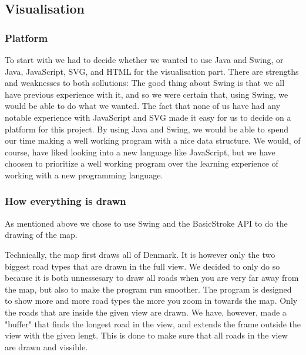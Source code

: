 \documentclass[a4paper,11pt]{article}
\begin{document}
\subsection{Visualisation} %
\label{sub:Visualisation}


\subsubsection{Platform} %
\label{subsub:Platform}
To start with we had to decide whether we wanted to use Java and Swing, or Java, JavaScript, SVG, and HTML for the visualisation part. There are strengths and weaknesses to both sollutions: The good thing about Swing is that we all have previous experience with it, and so we were certain that, using Swing, we would be able to do what we wanted. 
The fact that none of us have had any notable experience with JavaScript and SVG made it easy for us to decide on a platform for this project. By using Java and Swing, we would be able to spend our time making a well working program with a nice data structure. We would, of course, have liked looking into a new language like JavaScript, but we have choosen to prioritize a well working program over the learning experience of working with a new programming language.

\subsubsection{How everything is drawn} %
\label{subsub:How everything is drawn}
As mentioned above we chose to use Swing and the BasicStroke API to do the drawing of the map. 

Technically, the map first draws all of Denmark. It is however only the two biggest road types that are drawn in the full view. We decided to only do so because it is both unnessesary to draw all roads when you are very far away from the map, but also to make the program run smoother. The program is designed to show more and more road types the more you zoom in towards the map. Only the roads that are inside the given view are drawn. We have, however, made a "buffer" that finds the longest road in the view, and extends the frame outside the view with the given lengt. This is done to make sure that all roads in the view are drawn and vissible.
\end{document}
